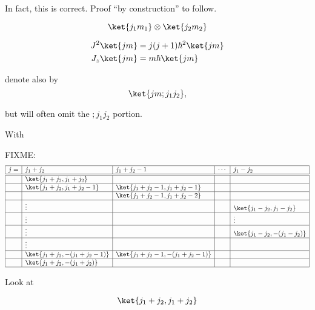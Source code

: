In fact, this is correct.  Proof ``by construction'' to follow.

\begin{equation}\label{eqn:qmTwoL17:500}
\ket{j_1 m_1} 
\otimes
\ket{j_2 m_2} 
\end{equation}

\begin{align}\label{eqn:qmTwoL17:520}
J^2 \ket{j m} &= j (j+1) \hbar^2 \ket{j m} \\
J_z \ket{j m} &= m \hbar \ket{j m}
\end{align}

denote also by
\begin{equation}\label{eqn:qmTwoL17:540}
\ket{j m ; j_1 j_2},
\end{equation}

but will often omit the $; j_1 j_2$ portion.

With 

FIXME:
\begin{equation}\label{eqn:qmTwoL17:560}
\begin{array}{| l | l | l | l | l |}
\hline
j = & j_1 + j_2				& j_1 + j_2 -1 				& \cdots 	& j_1 - j_2 \\
\hline
\hline
  &  \ket{j_1 + j_2, j_1 + j_2}	 	&					& 		& \\
\hline
  &  \ket{j_1 + j_2, j_1 + j_2 - 1}	&  \ket{j_1 + j_2 - 1, j_1 + j_2 - 1}	& 		& \\
\hline
  &                                     & \ket{j_1 + j_2 - 1, j_1 + j_2 - 2}	& 		& \\
\hline
  & \vdots 	 			&					& 		& \ket{j_1 - j_2, j_1 - j_2} \\
\hline
  & \vdots 	 			&					& 		& \vdots \\
\hline
  & \vdots 	 			&					& 		& \ket{j_1 - j_2, -(j_1 - j_2)} \\
\hline
  & \vdots 	 			&					& 		& \\
\hline
  &  \ket{j_1 + j_2, -(j_1 + j_2 - 1)}	& \ket{j_1 + j_2 -1, -(j_1 + j_2 - 1)}	& 		& \\
\hline
  &  \ket{j_1 + j_2, -(j_1 + j_2)}	&					& 		&  \\
\hline
\end{array}
\end{equation}

Look at 

\begin{equation}\label{eqn:qmTwoL17:580}
\ket{j_1 + j_2, j_1 + j_2}
\end{equation}

